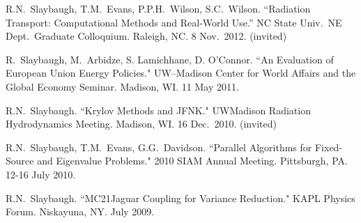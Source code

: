 \begin{bibsection}


\item R.N.\ Slaybaugh, T.M.\ Evans, P.P.H.\ Wilson, S.C.\ Wilson. ``Radiation Transport: Computational Methods and Real-World Use.'' NC State Univ.\ NE Dept.\ Graduate Colloquium. Raleigh, NC. 8 Nov.\ 2012. (invited)


\item R.\ Slaybaugh, M.\ Arbidze, S. Lamichhane, D. O'Connor. ``An Evaluation of European Union Energy Policies." UW--Madison Center for World Affairs and the Global Economy Seminar. Madison, WI. 11 May 2011.

\item R.N.\ Slaybaugh. ``Krylov Methods and JFNK." UW\textemdash Madison Radiation Hydrodynamics Meeting. Madison, WI. 16 Dec.\ 2010. (invited)

\item R.N.\ Slaybaugh, T.M.\ Evans, G.G.\ Davidson. ``Parallel Algorithms for Fixed-Source and Eigenvalue Problems." 2010 SIAM Annual Meeting. Pittsburgh, PA. 12-16 July 2010.


\item R.N.\ Slaybaugh. ``MC21\textemdash Jaguar Coupling for Variance Reduction." KAPL Physics Forum. Niskayuna, NY. July 2009.

\end{bibsection}


